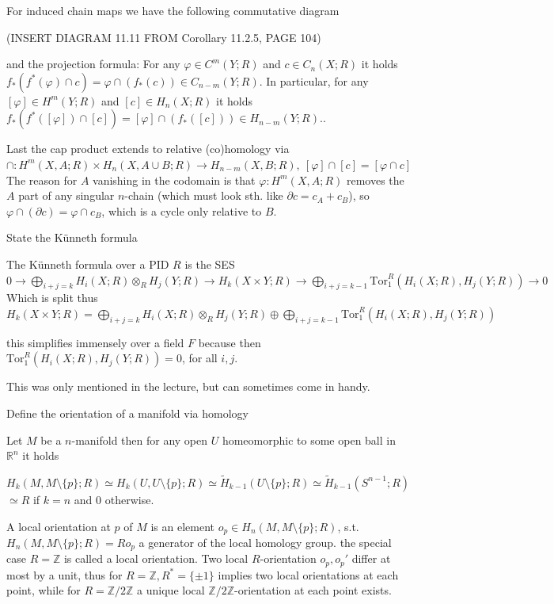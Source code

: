 For induced chain maps we have the following commutative diagram

(INSERT DIAGRAM 11.11 FROM Corollary 11.2.5, PAGE 104)

and the projection formula:
For any \(\varphi \in C^m(Y; R)\) and \(c \in C_n(X; R)\) it holds
\(
f_* (f^* (\varphi) \cap c) = \varphi \cap (f_*(c)) \in C_{n-m}(Y; R).
\)
In particular, for any \([\varphi] \in H^m(Y; R)\) and \([c] \in H_n(X; R)\) it holds
\(
f_* (f^* ([\varphi]) \cap [c]) = [\varphi] \cap (f_*([c])) \in H_{n-m}(Y; R).
\).

Last the cap product extends to relative (co)homology via
\( \cap : H^m(X, A;R) \times H_n(X, A \cup B;R) \to H_{n-m}(X,B;R),\ [\varphi] \cap [c] = [\varphi \cap c] \)
The reason for \( A \) vanishing in the codomain is that \( \varphi : H^m(X,A;R) \) removes the \( A \) part of any singular \( n \)-chain
(which must look sth. like \( \partial c = c_A + c_B \)), so \( \varphi \cap (\partial c) = \varphi \cap c_B \), which is a cycle only relative to \( B \).


State the Künneth formula

The Künneth formula over a PID \( R \)  is the SES
\( 0 \longrightarrow \bigoplus_{i+j=k} H_i(X;R) \otimes_R H_j(Y;R) \longrightarrow H_k(X \times Y;R) \longrightarrow \bigoplus_{i+j=k-1} \text{Tor}_1^R(H_i(X;R), H_j(Y;R)) \longrightarrow 0 \)
Which is split thus
\( H_k(X \times Y;R) = \bigoplus_{i+j=k} H_i(X;R) \otimes_R H_j(Y;R) \oplus \bigoplus_{i+j=k-1} \text{Tor}_1^R(H_i(X;R), H_j(Y;R)) \)

this simplifies immensely over a field \( F \) because then \( \text{Tor}_1^R(H_i(X;R), H_j(Y;R)) = 0 \), for all \( i,j \).

This was only mentioned in the lecture, but can sometimes come in handy.



Define the orientation of a manifold via homology


Let \( M \) be a \( n \)-manifold then for any open \( U \) homeomorphic to some open ball in \( \mathbb{R}^n \) it holds

\( H_k(M, M \setminus \{p\}; R) \simeq H_k(U, U \setminus \{p\};R) \simeq \tilde{H}_{k-1}(U \setminus \{p\};R) \simeq \tilde{H}_{k-1}(S^{n-1};R) \)
\( \simeq R \) if \( k = n \) and \( 0 \) otherwise.

A local orientation at \( p \) of \( M \)  is an element \( o_p \in H_n(M, M \setminus \{p\};R) \), s.t. \( H_n(M, M \setminus \{p\};R) = Ro_p \)  a generator of the 
local homology group. the special case \( R = \mathbb{Z} \) is called a local orientation.
Two local \( R \)-orientation \( o_p, o_p' \) differ at most by a unit, thus for \( R = \mathbb{Z}, R^\ast = \{\pm 1\} \) implies two local orientations at each point,
while for \( R = \mathbb{Z}/2\mathbb{Z} \) a unique local \( \mathbb{Z}/2\mathbb{Z} \)-orientation at each point exists.

